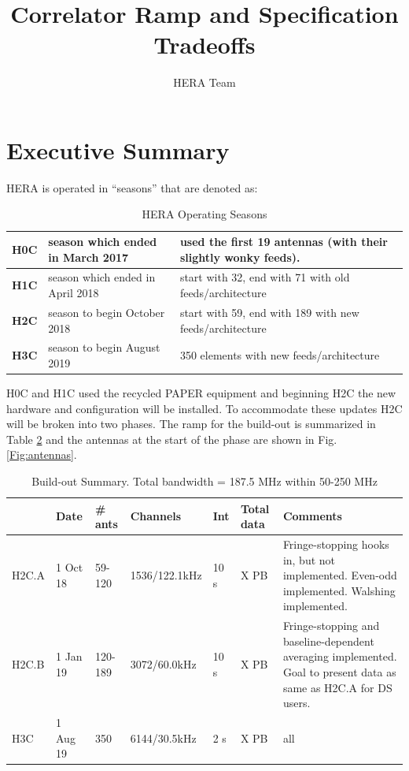 \documentclass{article}
\begin{document}
\author{HERA Team}
\title{Correlator Ramp and Specification Tradeoffs}
\maketitle

\setcounter{section}{-1}
\section*{Executive Summary}
HERA is operated in ``seasons'' that are denoted as:

\vspace{-0.25in}
\begin{table}[H]
\caption{HERA Operating Seasons \label{Tab:seasons}}
\begin{tabular}{p{0.5in} p{2.2in} p{3.5in}} \hline
{\bf H0C} & season which ended in March 2017 & used the first 19 antennas (with their slightly wonky feeds). \\ \hline
{\bf H1C} & season which ended in April 2018    & start with 32, end with 71 with old feeds/architecture\\ \hline
{\bf H2C} & season to begin October 2018         & start with 59, end with 189 with new feeds/architecture\\ \hline
{\bf H3C} & season to begin August 2019           & 350 elements with new feeds/architecture \\ \hline
\end{tabular}
\end{table}

H0C and H1C used the recycled PAPER equipment and beginning H2C the new hardware and configuration will be installed.  To accommodate these updates H2C will be broken into two phases.  
The ramp for the build-out is summarized in Table \ref{Tab:buildout} and the antennas at the start of the phase are shown in Fig. \ref{Fig:antennas}.

\vspace{-0.5cm}
\begin{table}[H]
\caption{Build-out Summary.  Total bandwidth = 187.5 MHz within 50-250 MHz\label{Tab:buildout}}
\begin{tabular}{l l l l l l p{2.2in}}
 & \textbf{Date} & \textbf{\# ants} & \textbf{Channels} & \textbf{Int} & \textbf{Total data} & \textbf{Comments} \\ \hline
H2C.A & 1 Oct 18 &  59-120   & 1536/122.1kHz & 10 s&  X PB& Fringe-stopping hooks in, but not implemented.  Even-odd implemented. Walshing implemented.\\ \hline
H2C.B & 1 Jan 19 & 120-189 & 3072/60.0kHz & 10 s& X PB & Fringe-stopping and baseline-dependent averaging implemented.  Goal to present data as same as H2C.A for DS users.\\ \hline
H3C    & 1 Aug 19 &  350       & 6144/30.5kHz & 2  s&  X PB & all\\ \hline
\end{tabular}
\end{table}
\vspace{1cm}
\end{document}
